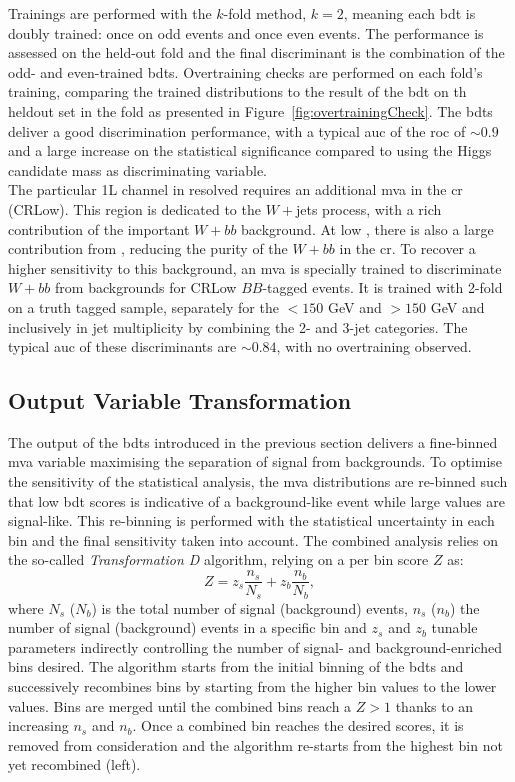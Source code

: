 Trainings are performed with the $k$-fold method, $k = 2$, meaning each \gls{bdt} is doubly trained: once on odd events and once even events. The performance is assessed on the held-out fold and the final discriminant is the combination of the odd- and even-trained \gls{bdt}s. Overtraining checks are performed on each fold's training, comparing the trained distributions to the result of the \gls{bdt} on th heldout set in the fold as presented in Figure~\ref{fig:overtrainingCheck}. The \gls{bdt}s deliver a good discrimination performance, with a typical \gls{auc} of the \gls{roc} of $\sim0.9$ and a large increase on the statistical significance compared to using the Higgs candidate mass as discriminating variable. \\
  
The particular 1L channel in \vhb resolved requires an additional \gls{mva} in the \lowdr \gls{cr} (CRLow). This region is dedicated to the $W+$jets process, with a rich contribution of the important $W+bb$ background. At low \ptv, there is also a large contribution from \ttb, reducing the purity of the $W+bb$ in the \gls{cr}. To recover a higher sensitivity to this background, an \gls{mva} is specially trained to discriminate $W+bb$ from backgrounds for CRLow $BB$-tagged events. It is trained with 2-fold on a truth tagged sample, separately for the \ptv $< 150$ GeV and \ptv $> 150$ GeV and inclusively in jet multiplicity by combining the 2- and 3-jet categories. The typical \gls{auc} of these discriminants are $\sim0.84$, with no overtraining observed.

\subsection{Output Variable Transformation}
The output of the \gls{bdt}s introduced in the previous section delivers a fine-binned \gls{mva} variable maximising the separation of signal from backgrounds. To optimise the sensitivity of the statistical analysis, the \gls{mva} distributions are re-binned such that low \gls{bdt} scores is indicative of a background-like event while large values are signal-like. This re-binning is performed with the statistical uncertainty in each bin and the final sensitivity taken into account. The combined analysis relies on the so-called \textit{Transformation D} algorithm, relying on a per bin score $Z$ as:
\begin{equation}
    Z = z_s \frac{n_s}{N_s} + z_b \frac{n_b}{N_b},
\end{equation} 
where $N_s$ ($N_b$) is the total number of signal (background) events, $n_s$ ($n_b$) the number of signal (background) events in a specific bin and $z_s$ and $z_b$ tunable parameters indirectly controlling the number of signal- and background-enriched bins desired. The algorithm starts from the initial binning of the \gls{bdt}s and successively recombines bins by starting from the higher bin values to the lower values. Bins are merged until the combined bins reach a $Z > 1$ thanks to an increasing $n_s$ and $n_b$. Once a combined bin reaches the desired scores, it is removed from consideration and the algorithm re-starts from the highest bin not yet recombined (left).\\

